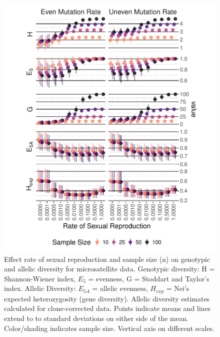 \documentclass[]{article}
\theoremstyle{definition}
\theoremstyle{definition}
\theoremstyle{remark}
\begin{document}
\begin{figure}
\centering
\includegraphics[width=1.00000\textwidth]{figure/diversity_stats.pdf}
\caption{Effect rate of sexual reproduction and sample size (n) on
genotypic and allelic diversity for microsatellite data. Genotypic
diversity: H = Shannon-Wiener index, \(E_5\) = evenness, G = Stoddart
and Taylor's index. Allelic Diversity: \(E_{5A}\) = allelic evenness,
\(H_{exp}\) = Nei's expected heterozygosity (gene diversity). Allelic
diversity estimates calculated for clone-corrected data. Points indicate
means and lines extend to to standard deviations on either side of the
mean. Color/shading indicates sample size. Vertical axis on different
scales.}\label{fig:simdiv}
\end{figure}
\end{document}

